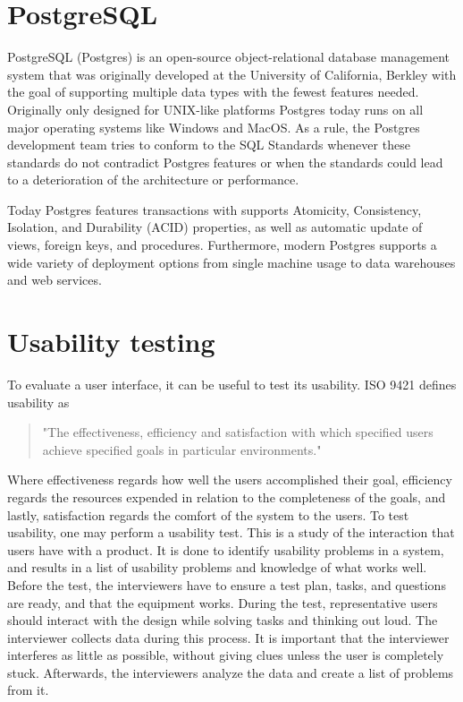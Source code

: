\section*{PostgreSQL}
PostgreSQL (Postgres) is an open-source object-relational database management system that was originally developed at the University of California, Berkley with the goal of supporting multiple data types with the fewest features needed. Originally only designed for UNIX-like platforms Postgres today runs on all major operating systems like Windows and MacOS\cite{Postgres_Docs}.
As a rule, the Postgres development team tries to conform to the SQL Standards whenever these standards do not contradict Postgres features or when the standards could lead to a deterioration of the architecture or performance\cite{Postgres_Docs}.

Today Postgres features transactions with supports Atomicity, Consistency, Isolation, and Durability (ACID) properties, as well as automatic update of views, foreign keys, and procedures.
Furthermore, modern Postgres supports a wide variety of deployment options from single machine usage to data warehouses and web services\cite{Postgres_Docs}.

\section*{Usability testing}
To evaluate a user interface, it can be useful to test its usability. ISO 9421 defines usability as
\begin{quote}
	"The effectiveness, efficiency and satisfaction with which specified users achieve specified goals in particular environments."
\end{quote}

Where effectiveness regards how well the users accomplished their goal, efficiency regards the resources expended in relation to the completeness of the goals, and lastly, satisfaction regards the comfort of the system to the users.
To test usability, one may perform a usability test. This is a study of the interaction that users have with a product. It is done to identify usability problems in a system, and results in a list of usability problems and knowledge of what works well.
Before the test, the interviewers have to ensure a test plan, tasks, and questions are ready, and that the equipment works.
During the test, representative users should interact with the design while solving tasks and thinking out loud. The interviewer collects data during this process. It is important that the interviewer interferes as little as possible, without giving clues unless the user is completely stuck.
Afterwards, the interviewers analyze the data and create a list of problems from it.
\cite{deb7}

